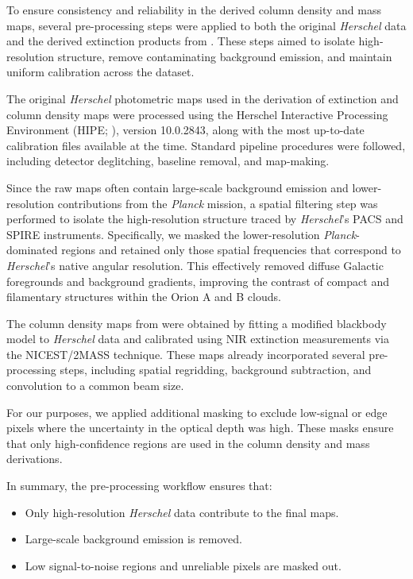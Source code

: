 To ensure consistency and reliability in the derived column density and mass maps, several pre-processing steps were applied to both the original \textit{Herschel} data and the derived extinction products from \cite{lombardi2014herschel}. These steps aimed to isolate high-resolution structure, remove contaminating background emission, and maintain uniform calibration across the dataset.

The original \textit{Herschel} photometric maps used in the derivation of extinction and column density maps were processed using the Herschel Interactive Processing Environment (HIPE; \cite{mizumoto2010astronomical}), version 10.0.2843, along with the most up-to-date calibration files available at the time. Standard pipeline procedures were followed, including detector deglitching, baseline removal, and map-making.

Since the raw maps often contain large-scale background emission and lower-resolution contributions from the \textit{Planck} mission, a spatial filtering step was performed to isolate the high-resolution structure traced by \textit{Herschel}'s PACS and SPIRE instruments. Specifically, we masked the lower-resolution \textit{Planck}-dominated regions and retained only those spatial frequencies that correspond to \textit{Herschel}'s native angular resolution. This effectively removed diffuse Galactic foregrounds and background gradients, improving the contrast of compact and filamentary structures within the Orion A and B clouds.

The column density maps from \cite{lombardi2014herschel} were obtained by fitting a modified blackbody model to \textit{Herschel} data and calibrated using NIR extinction measurements via the NICEST/2MASS technique. These maps already incorporated several pre-processing steps, including spatial regridding, background subtraction, and convolution to a common beam size.

For our purposes, we applied additional masking to exclude low-signal or edge pixels where the uncertainty in the optical depth was high. These masks ensure that only high-confidence regions are used in the column density and mass derivations.

In summary, the pre-processing workflow ensures that:
\begin{itemize}
    \item Only high-resolution \textit{Herschel} data contribute to the final maps.
    \item Large-scale background emission is removed.
    \item Low signal-to-noise regions and unreliable pixels are masked out.
\end{itemize}

